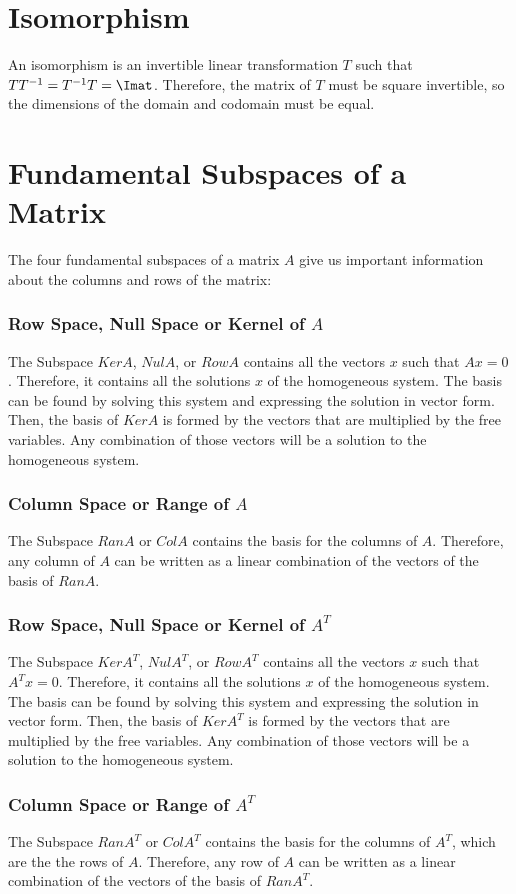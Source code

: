\section*{Isomorphism}

An isomorphism is an invertible linear transformation $T$ such that $TT^{-1}=T^{-1}T=\Imat$. Therefore, the matrix of $T$ must be square invertible, so the dimensions of the domain and codomain must be equal.

\section*{Fundamental Subspaces of a Matrix}

The four fundamental subspaces of a matrix $A$ give us important information about the columns and rows of the matrix:

\subsubsection*{Row Space, Null Space or Kernel of $A$}

The Subspace $KerA$, $NulA$, or $RowA$ contains all the vectors $x$ such that $Ax=0$. Therefore, it contains all the solutions $x$ of the homogeneous system. The basis can be found by solving this system and expressing the solution in vector form. Then, the basis of $KerA$ is formed by the vectors that are multiplied by the free variables. Any combination of those vectors will be a solution to the homogeneous system.

\subsubsection*{Column Space or Range of $A$}

The Subspace $RanA$ or $ColA$ contains the basis for the columns of $A$. Therefore, any column of $A$ can be written as a linear combination of the vectors of the basis of $RanA$.

\subsubsection*{Row Space, Null Space or Kernel of $A^T$}

The Subspace $KerA^T$, $NulA^T$, or $RowA^T$ contains all the vectors $x$ such that $A^Tx=0$. Therefore, it contains all the solutions $x$ of the homogeneous system. The basis can be found by solving this system and expressing the solution in vector form. Then, the basis of $KerA^T$ is formed by the vectors that are multiplied by the free variables. Any combination of those vectors will be a solution to the homogeneous system.

\subsubsection*{Column Space or Range of $A^T$}

The Subspace $RanA^T$ or $ColA^T$ contains the basis for the columns of $A^T$, which are the the rows of $A$. Therefore, any row of $A$ can be written as a linear combination of the vectors of the basis of $RanA^T$.